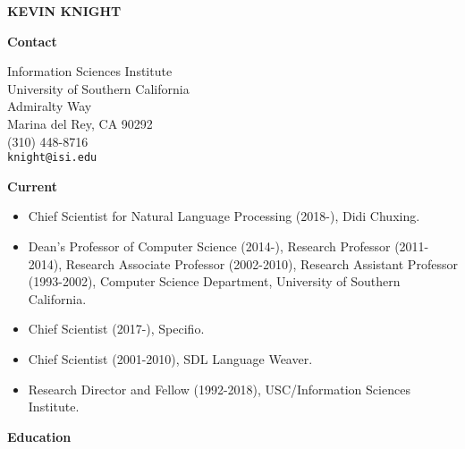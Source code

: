 

\newcommand{\hd}[1]{
\vspace*{0.2in} 
\noindent 
{\bf \Large #1}
\vspace*{0.1in} 
}

\pagestyle{plain}


\begin{center}
{\Large \bf KEVIN KNIGHT} \\
\end{center}

\vspace{0.2in}

\hd{Contact}

\bigskip

Information Sciences Institute \\
\indent
University of Southern California \\
 Admiralty Way \\
\indent
Marina del Rey, CA 90292 \\
\indent
(310) 448-8716 \\
\indent
\verb+knight@isi.edu+ 


\hd{Current}

\begin{itemize}
\item Chief Scientist for Natural Language Processing (2018-), Didi Chuxing.

\item Dean's Professor of Computer Science (2014-), 
Research Professor (2011-2014), 
Research Associate Professor (2002-2010),
Research Assistant Professor (1993-2002), 
Computer Science Department, 
University of Southern California.  

\item Chief Scientist (2017-), Specifio.

\item Chief Scientist (2001-2010), SDL Language Weaver.

\item Research Director and Fellow (1992-2018),
USC/Information Sciences Institute.
\end{itemize}


\hd{Education}

